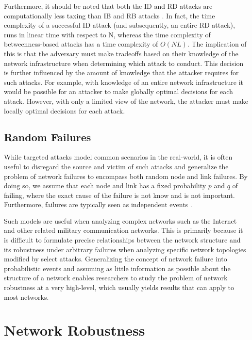 \documentclass[doc]{apa}%
\begin{document}
Furthermore, it should be noted that both the ID and RD attacks are computationally less taxing than IB and RB attacks \cite{Attacks}. In fact, the time complexity of a successful ID attack (and subsequently, an entire RD attack), runs in linear time with respect to N, whereas the time complexity of betweenness-based attacks has a time complexity of $O(NL)$. The implication of this is that the adversary must make tradeoffs based on their knowledge of the network infrastructure when determining which attack to conduct. This decision is further influenced by the amount of knowledge that the attacker requires for such attacks. For example, with knowledge of an entire network infrastructure it would be possible for an attacker to make globally optimal decisions for each attack. However, with only a limited view of the network, the attacker must make locally optimal decisions for each attack. 

\subsection{Random Failures}
\label{RandomFailures}
While targeted attacks model common scenarios in the real-world, it is often useful to disregard the source and victim of such attacks and generalize the problem of network failures to encompass both random node and link failures. By doing so, we assume that each node and link has a fixed probability $p$ and $q$ of failing, where the exact cause of the failure is not know and is not important. Furthermore, failures are typically seen as independent events \cite{RandomStudy}. 

Such models are useful when analyzing complex networks such as the Internet and other related military communication networks. This is primarily because it is difficult to formulate precise relationships between the network structure and its robustness under arbitrary failures when analyzing specific network topologies modified by select attacks. Generalizing the concept of network failure into probabilistic events and assuming as little information as possible about the structure of a network enables researchers to study the problem of network robustness at a very high-level, which usually yields results that can apply to most networks. 

\section{Network Robustness}
\end{document}
